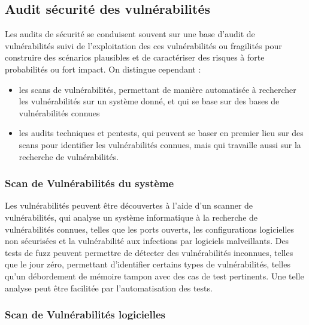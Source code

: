 \subsection{Audit sécurité des vulnérabilités}

Les audits de sécurité se conduisent souvent sur une base d'audit de vulnérabilités suivi de l'exploitation des ces vulnérabilités ou fragilités pour construire des scénarios plausibles et de caractériser des risques à forte probabilités ou fort impact.
On distingue cependant :
\begin{itemize}
	\item les scans de vulnérabilités, permettant de manière automatisée à rechercher les vulnérabilités sur un système donné, et qui se base sur des bases de vulnérabilités connues
	\item les audits techniques et pentests, qui peuvent se baser en premier lieu sur des scans pour identifier les vulnérabilités connues, mais qui travaille aussi sur la recherche de vulnérabilités.
\end{itemize}


\subsubsection{Scan de Vulnérabilités du système}

Les vulnérabilités peuvent être découvertes à l'aide d'un scanner de vulnérabilités, qui analyse un système informatique à la recherche de vulnérabilités connues, telles que les ports ouverts, les configurations logicielles non sécurisées et la vulnérabilité aux infections par logiciels malveillants. Des tests de fuzz peuvent permettre de détecter des vulnérabilités inconnues, telles que le jour zéro, permettant d'identifier certains types de vulnérabilités, telles qu'un débordement de mémoire tampon avec des cas de test pertinents. Une telle analyse peut être facilitée par l’automatisation des tests. 

\subsubsection{Scan de Vulnérabilités logicielles}

